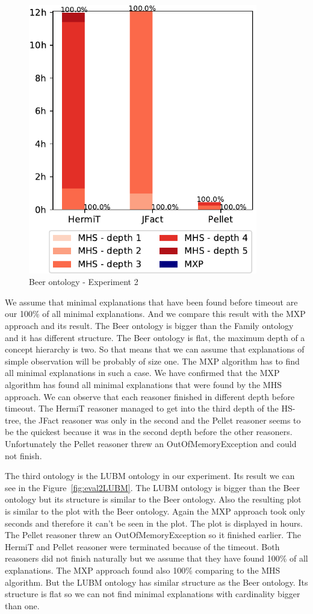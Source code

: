 \documentclass[12pt,a4paper]{article}
\begin{document}
\begin{figure}[H]
	\centering
	\includegraphics[width=10cm]{eval2Beer} 
	\caption{Beer ontology - Experiment 2}
	\label{fig:eval2Beer}
\end{figure}

We assume that minimal explanations that have been found before timeout are our 100\% of all minimal explanations. And we compare this result with the MXP approach and its result. The Beer ontology is bigger than the Family ontology and it has different structure. The Beer ontology is flat, the maximum depth of a concept hierarchy is two. So that means that we can assume that explanations of simple observation will be probably of size one. The MXP algorithm has to find all minimal explanations in such a case. We have confirmed that the MXP algorithm has found all minimal explanations that were found by the MHS approach. We can observe that each reasoner finished in different depth before timeout. The HermiT reasoner managed to get into the third depth of the HS-tree, the JFact reasoner was only in the second and the Pellet reasoner seems to be the quickest because it was in the second depth before the other reasoners. Unfortunately the Pellet reasoner threw an OutOfMemoryException and could not finish.


The third ontology is the LUBM ontology in our experiment. Its result we can see in the Figure~\ref{fig:eval2LUBM}. The LUBM ontology is bigger than the Beer ontology but its structure is similar to the Beer ontology. Also the resulting plot is similar to the plot with the Beer ontology. Again the MXP approach took only seconds and therefore it can't be seen in the plot. The plot is displayed in hours. The Pellet reasoner threw an OutOfMemoryException so it finished earlier. The HermiT and Pellet reasoner were terminated because of the timeout. Both reasoners did not finish naturally but we assume that they have found 100\% of all explanations. The MXP approach found also 100\% comparing to the MHS algorithm. But the LUBM ontology has similar structure as the Beer ontology. Its structure is flat so we can not find minimal explanations with cardinality bigger than one.
\end{document}
